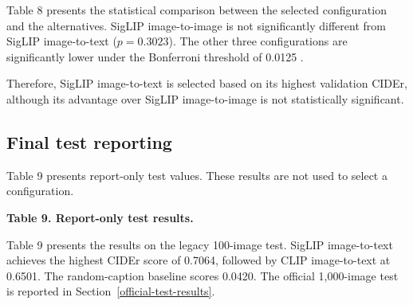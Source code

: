 \documentclass{article}
\begin{document}
Table 8 presents the statistical comparison between the selected
configuration and the alternatives. SigLIP image-to-image is not
significantly different from SigLIP image-to-text
(\(p=0.3023\)). The other three configurations are significantly
lower under the Bonferroni threshold of 0.0125 \cite{cohen_statistical_2013}.

Therefore, SigLIP image-to-text is selected based on its highest
validation CIDEr, although its advantage over SigLIP image-to-image
is not statistically significant.

\subsection{Final test reporting}\label{final-test-reporting}

Table 9 presents report-only test values.
These results are not used to select a configuration.

\begin{center}
\textbf{Table 9. Report-only test results.}
\end{center}
\label{tab:test-results}

\begin{table}[htbp]
\centering
{}
\end{table}

Table 9 presents the results on the legacy 100-image test. SigLIP
image-to-text achieves the highest CIDEr score of 0.7064, followed by CLIP
image-to-text at 0.6501. The random-caption baseline scores 0.0420.
The official 1,000-image test is reported in Section~\ref{official-test-results}.
\end{document}
